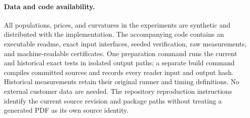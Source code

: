 \paragraph{Data and code availability.}
All populations, prices, and curvatures in the experiments are synthetic and distributed with the implementation. The accompanying code contains an executable readme, exact input interfaces, seeded verification, raw measurements, and machine-readable certificates. One preparation command runs the current and historical exact tests in isolated output paths; a separate build command compiles committed sources and records every reader input and output hash. Historical measurements retain their original runner and timing definitions. No external customer data are needed. The repository reproduction instructions identify the current source revision and package paths without treating a generated PDF as its own source identity.
